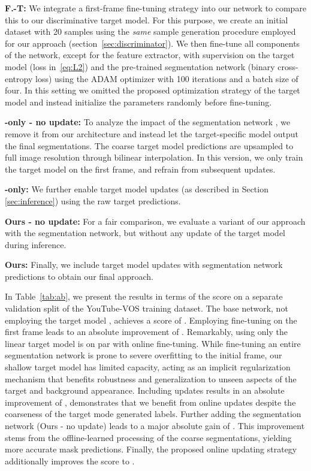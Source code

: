 \noindent\textbf{F.-T:} We integrate a first-frame fine-tuning strategy into our network to compare this to our discriminative target model. For this purpose, we create an initial dataset  with 20 samples using the \emph{same} sample generation procedure employed for our approach (section~\ref{sec:discriminator}). We then fine-tune all components of the network, except for the feature extractor, with supervision on the target model (loss in~\eqref{eq:L2}) and the pre-trained segmentation network (binary cross-entropy loss) using the ADAM optimizer with 100 iterations and a batch size of four. In this setting we omitted the proposed optimization strategy of the target model and instead initialize the parameters randomly before fine-tuning.

\noindent\textbf{-only - no update:} To analyze the impact of the segmentation network , we remove it from our architecture and instead let the target-specific model  output the final segmentations. The coarse target model predictions are upsampled to full image resolution through bilinear interpolation. In this version, we only train the target model  on the first frame, and refrain from subsequent updates.

\noindent\textbf{-only:} We further enable target model updates (as described in Section \ref{sec:inference}) using the raw target predictions.

\noindent\textbf{Ours - no update:} For a fair comparison, we evaluate a variant of our approach with the segmentation network, but without any update of the target model  during inference.

\noindent\textbf{Ours:} Finally, we include target model updates with segmentation network predictions to obtain our final approach.

In Table~\ref{tab:ab}, we present the results in terms of the  score on a separate validation split of the YouTube-VOS training dataset. The base network, not employing the target model , achieves a score of . Employing fine-tuning on the first frame leads to an absolute improvement of . Remarkably, using only the linear target model  is on par with online fine-tuning. While fine-tuning an entire segmentation network is prone to severe overfitting to the initial frame, our shallow target model has limited capacity, acting as an implicit regularization mechanism that benefits robustness and generalization to unseen aspects of the target and background appearance.
Including updates results in an absolute improvement of , demonstrates that we benefit from online updates despite the coarseness of the target mode generated labels. Further adding the segmentation network  (Ours - no update) leads to a major absolute gain of . This improvement stems from the offline-learned processing of the coarse segmentations, yielding more accurate mask predictions. Finally, the proposed online updating strategy additionally improves the score to . 

